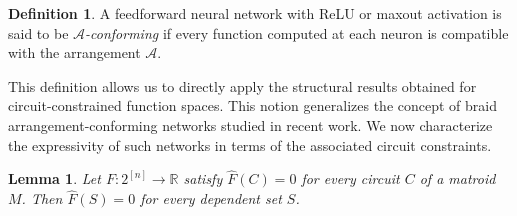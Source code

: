 \documentclass{amsart}
\newtheorem{lemma}[theorem]{Lemma}
\theoremstyle{definition}
\newtheorem{definition}[theorem]{Definition}
\begin{document}
\begin{definition}
A feedforward neural network with ReLU or maxout activation is said to be \emph{$\mathcal{A}$-conforming} if every function computed at each neuron is compatible with the arrangement $\mathcal{A}$.
\end{definition}
\noindent
This definition allows us to directly apply the structural results obtained for circuit-constrained function spaces.
This notion generalizes the concept of braid arrangement-conforming networks studied in recent work. We now characterize the expressivity of such networks in terms of the associated circuit constraints.
\begin{lemma}
Let $F : 2^{[n]} \to \mathbb{R}$ satisfy $\widehat{F}(C)=0$ for every circuit $C$ of a matroid $M$. Then $\widehat{F}(S)=0$ for every dependent set $S$.
\end{lemma}
\end{document}
